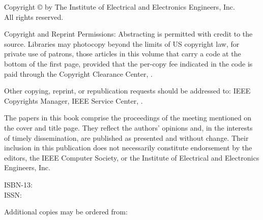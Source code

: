 \clearpage
\thispagestyle{empty}

{\small
\begin{center}
Copyright \copyright{} \the\year{}
by The Institute of Electrical and Electronics Engineers, Inc.\\
All rights reserved.
\end{center}

Copyright and Reprint Permissions: Abstracting is permitted with credit to the source. Libraries may photocopy beyond the limits of US copyright law, for private use of patrons, those articles in this volume that carry a code at the bottom of the first page, provided that the per-copy fee indicated in the code is paid through the Copyright Clearance Center,
.

Other copying, reprint, or republication requests should be addressed to: IEEE Copyrights Manager, IEEE Service Center,
.

The papers in this book comprise the proceedings of the meeting mentioned on the cover and title page. They reflect the authors’ opinions and, in the interests of timely dissemination, are published as presented and without change. Their inclusion in this publication does not necessarily constitute endorsement by the editors, the IEEE Computer Society, or the Institute of Electrical and Electronics Engineers, Inc.

\begin{center}
ISBN-13:  \\
ISSN: 
\end{center}

\begin{center}
Additional copies may be ordered from:
\end{center}

}
